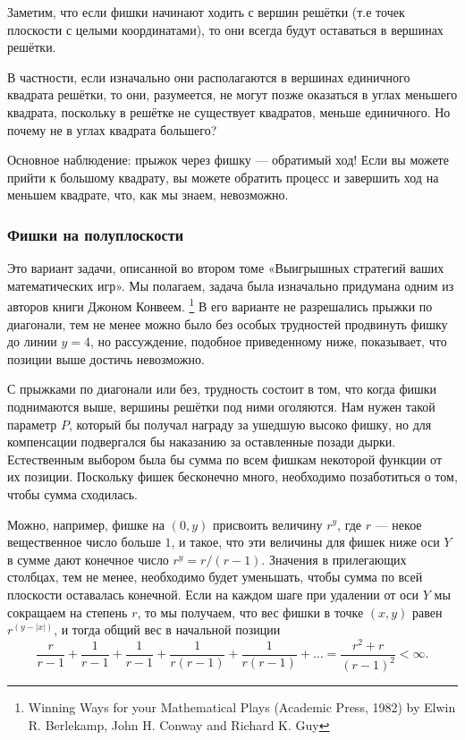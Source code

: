 Заметим, что если фишки начинают ходить с вершин решётки (т.е точек плоскости с целыми координатами), то они всегда будут оставаться в вершинах решётки.

В частности, если изначально они располагаются в вершинах единичного квадрата решётки, то они, разумеется, не могут позже оказаться в углах меньшего квадрата, поскольку в решётке не существует квадратов, меньше единичного.
Но почему не в углах квадрата большего?

Основное наблюдение: прыжок через фишку --- обратимый ход! Если вы можете прийти к большому квадрату, вы можете обратить процесс и завершить ход на меньшем квадрате, что, как мы знаем, невозможно.
\heart

\subsubsection*{Фишки на полуплоскости}%

Это вариант задачи, описанной во втором томе «Выигрышных стратегий ваших математических игр».
Мы полагаем, задача была изначально придумана одним из авторов книги Джоном Конвеем.%
\footnote{Winning Ways for your Mathematical Plays (Academic Press, 1982) by Elwin R. Berlekamp, John H. Conway and Richard K. Guy}
В его варианте не разрешались прыжки по диагонали, тем не менее можно было без особых трудностей продвинуть фишку до линии $y = 4$, но рассуждение, подобное приведенному ниже, показывает, что позиции выше достичь невозможно.

С прыжками по диагонали или без, трудность состоит в том, что когда фишки поднимаются выше, вершины решётки под ними оголяются.
Нам нужен такой параметр $P$, который бы получал награду за ушедшую высоко фишку, но для компенсации подвергался бы наказанию за оставленные позади дырки.
Естественным выбором была бы сумма по всем фишкам некоторой функции от их позиции.
Поскольку фишек бесконечно много, необходимо позаботиться о том, чтобы сумма сходилась.

Можно, например, фишке на $(0, y)$ присвоить величину $r^y$, где $r$ --- некое вещественное число больше $1$, и такое, что эти величины для фишек ниже оси $Y$ в сумме дают конечное число $r^y = r / (r-1)$.
Значения в прилегающих столбцах, тем не менее, необходимо будет уменьшать, чтобы сумма по всей плоскости оставалась конечной.
Если на каждом шаге при удалении от оси $Y$ мы сокращаем на степень $r$, то мы получаем, что вес фишки в точке $(x, y)$ равен $r^(y - |x|)$, и тогда общий вес в начальной позиции 
\[\frac r{r-1} + \frac 1{r-1} +\frac 1{r-1} +\frac 1{r(r-1)} +\frac 1{r(r-1)} + \dots =\frac{r^2+r}{(r-1)^2} <\infty .\]

